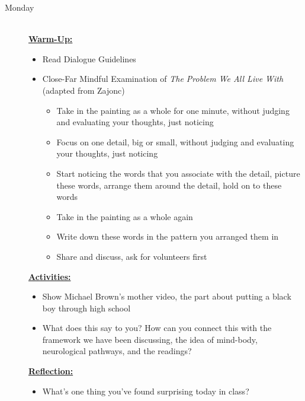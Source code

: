 \documentclass{article}
\newcommand{\listmon}{\item[\large\textsf{Monday}\normalsize] \hfill \\}
\newenvironment{daywu}
	{\underline{\textbf{Warm-Up:}} \hfill \\
	\begin{itemize}}
	{\end{itemize}}
\newenvironment{dayact}
	{\underline{\textbf{Activities:}} \hfill \\
	\begin{itemize}}
	{\end{itemize}}
\newenvironment{dayref}
	{\underline{\textbf{Reflection:}} \hfill \\
	\begin{itemize}}
	{\end{itemize}}
\newenvironment{weeksched}
	{\noindent
	\begin{description}}
	{\end{description}
	\newpage}
\begin{document}
\begin{weeksched}

\listmon
\begin{daywu}
	\item Read Dialogue Guidelines
	\item Close-Far Mindful Examination of \textit{The Problem We All Live With} (adapted from Zajonc)
	\begin{itemize}
		\item Take in the painting as a whole for one minute, without judging and evaluating your thoughts, just noticing
		\item Focus on one detail, big or small, without judging and evaluating your thoughts, just noticing
		\item Start noticing the words that you associate with the detail, picture these words, arrange them around the detail, hold on to these words
		\item Take in the painting as a whole again
		\item Write down these words in the pattern you arranged them in
		\item Share and discuss, ask for volunteers first
	\end{itemize}
\end{daywu}
\begin{dayact}
	\item Show Michael Brown's mother video, the part about putting a black boy through high school
	\item What does this say to you? How can you connect this with the framework we have been discussing, the idea of mind-body, neurological pathways, and the readings?
\end{dayact}
\begin{dayref}
	\item What's one thing you've found surprising today in class?
\end{dayref}

\pagebreak


\end{weeksched}
\end{document}
